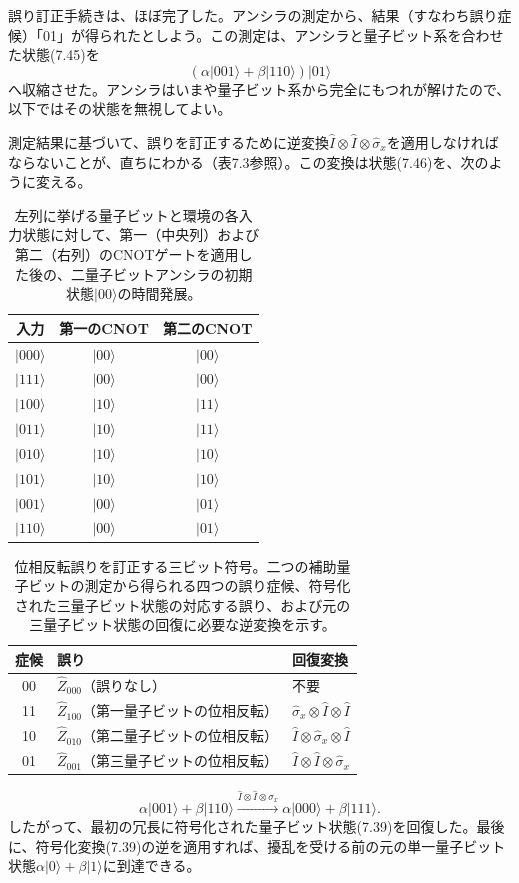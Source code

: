 誤り訂正手続きは、ほぼ完了した。アンシラの測定から、結果（すなわち誤り症候）「01」が得られたとしよう。この測定は、アンシラと量子ビット系を合わせた状態(7.45)を
\begin{equation}(\alpha|001\rangle+\beta|110\rangle)|01\rangle\tag{7.46}\end{equation}
へ収縮させた。アンシラはいまや量子ビット系から完全にもつれが解けたので、以下ではその状態を無視してよい。

測定結果に基づいて、誤りを訂正するために逆変換$\hat I\otimes\hat I\otimes\hat\sigma_x$を適用しなければならないことが、直ちにわかる（表7.3参照）。この変換は状態(7.46)を、次のように変える。
\begin{table}[htbp]\centering\small
\caption{左列に挙げる量子ビットと環境の各入力状態に対して、第一（中央列）および第二（右列）のCNOTゲートを適用した後の、二量子ビットアンシラの初期状態$|00\rangle$の時間発展。}
\begin{tabular}{ccc}\hline 入力&第一のCNOT&第二のCNOT\\\hline
$|000\rangle$&$|00\rangle$&$|00\rangle$\\
$|111\rangle$&$|00\rangle$&$|00\rangle$\\
$|100\rangle$&$|10\rangle$&$|11\rangle$\\
$|011\rangle$&$|10\rangle$&$|11\rangle$\\
$|010\rangle$&$|10\rangle$&$|10\rangle$\\
$|101\rangle$&$|10\rangle$&$|10\rangle$\\
$|001\rangle$&$|00\rangle$&$|01\rangle$\\
$|110\rangle$&$|00\rangle$&$|01\rangle$\\\hline\end{tabular}\end{table}
\hypertarget{srcpage:319}{}\label{srcpage:319}
\begin{table}[htbp]\centering\small
\caption{位相反転誤りを訂正する三ビット符号。二つの補助量子ビットの測定から得られる四つの誤り症候、符号化された三量子ビット状態の対応する誤り、および元の三量子ビット状態の回復に必要な逆変換を示す。}
\begin{tabular}{cll}\hline 症候&誤り&回復変換\\\hline
00&$\hat Z_{000}$（誤りなし）&不要\\
11&$\hat Z_{100}$（第一量子ビットの位相反転）&$\hat\sigma_x\otimes\hat I\otimes\hat I$\\
10&$\hat Z_{010}$（第二量子ビットの位相反転）&$\hat I\otimes\hat\sigma_x\otimes\hat I$\\
01&$\hat Z_{001}$（第三量子ビットの位相反転）&$\hat I\otimes\hat I\otimes\hat\sigma_x$\\\hline\end{tabular}\end{table}
\begin{equation}\alpha|001\rangle+\beta|110\rangle\xrightarrow{\hat I\otimes\hat I\otimes\hat\sigma_x}\alpha|000\rangle+\beta|111\rangle.\tag{7.47}\end{equation}
したがって、最初の冗長に符号化された量子ビット状態(7.39)を回復した。最後に、符号化変換(7.39)の逆を適用すれば、擾乱を受ける前の元の単一量子ビット状態$\alpha|0\rangle+\beta|1\rangle$に到達できる。

